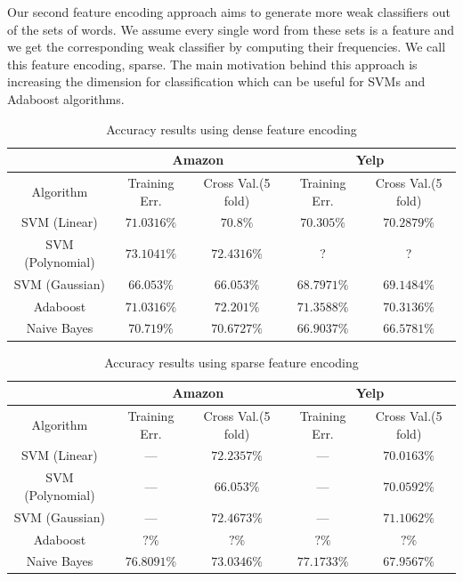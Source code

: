 \documentclass[letterpaper]{article}
\begin{document}
Our second feature encoding approach aims to generate more weak classifiers out of the sets
of words. We assume every single word from these sets is a feature and
we get the corresponding weak classifier by computing their
frequencies. We call this feature encoding, sparse. The main
motivation behind this approach is increasing the dimension for
classification which can be useful for SVMs and Adaboost algorithms.

\begin{table}[ht]
\centering
\begin{tabular}{c | c c | c c}
 & \multicolumn{2}{|c|}{Amazon} & \multicolumn{2}{|c}{Yelp} \\
\hline
Algorithm & Training Err. & Cross Val.(5 fold) & Training Err. & Cross Val.(5 fold)\\
\hline
SVM (Linear) 		& $71.0316\%$ & $70.8\%$ & $70.305\%$ & $70.2879\%$\\
SVM (Polynomial) 	& $73.1041\%$ & $72.4316\%$ & ? & ?\\
SVM (Gaussian) 		& $66.053\%$ & $66.053\%$ & $68.7971\%$ & $69.1484\%$\\
Adaboost 			& $71.0316\%$ & $72.201\%$ & $71.3588\%$ & $70.3136\%$\\ 
Naive Bayes 		& $70.719\%$ & $70.6727\%$ & $66.9037\%$ & $66.5781\%$\\ 
\end{tabular}
\caption{Accuracy results using dense feature encoding}
\label{tab:dense}
\end{table}


\begin{table}[ht]
\centering
\begin{tabular}{c | c c | c c}
 & \multicolumn{2}{|c|}{Amazon} & \multicolumn{2}{|c}{Yelp} \\
\hline
Algorithm & Training Err. & Cross Val.(5 fold) & Training Err. & Cross Val.(5 fold)\\
\hline
SVM (Linear) 		& --- & $72.2357\%$ & --- & $70.0163\%$\\
SVM (Polynomial) 	& --- & $66.053\%$ & --- & $70.0592\%$\\
SVM (Gaussian) 		& --- & $72.4673\%$ & --- & $71.1062\%$\\
Adaboost 			& $?\%$ & $?\%$ & $?\%$ & $?\%$\\ 
Naive Bayes 		& $76.8091\%$ & $73.0346\%$ & $77.1733\%$ & $67.9567\%$\\ 
\end{tabular}
\caption{Accuracy results using sparse feature encoding}
\label{tab:sparse}
\end{table}
\end{document}
